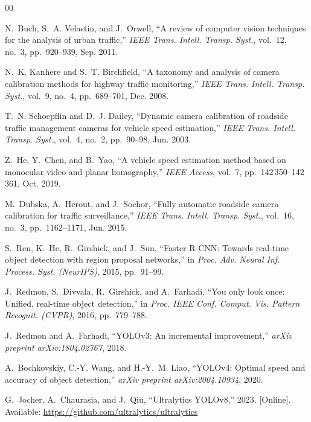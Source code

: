 \documentclass[conference]{IEEEtran}
\begin{document}

\begin{thebibliography}{00}

N.~Buch, S.~A. Velastin, and J.~Orwell, ``A review of computer vision techniques for the analysis of urban traffic,'' \emph{IEEE Trans. Intell. Transp. Syst.}, vol.~12, no.~3, pp.~920--939, Sep. 2011.

N.~K. Kanhere and S.~T. Birchfield, ``A taxonomy and analysis of camera calibration methods for highway traffic monitoring,'' \emph{IEEE Trans. Intell. Transp. Syst.}, vol.~9, no.~4, pp.~689--701, Dec. 2008.

T.~N. Schoepflin and D.~J. Dailey, ``Dynamic camera calibration of roadside traffic management cameras for vehicle speed estimation,'' \emph{IEEE Trans. Intell. Transp. Syst.}, vol.~4, no.~2, pp.~90--98, Jun. 2003.

Z.~He, Y.~Chen, and B.~Yao, ``A vehicle speed estimation method based on monocular video and planar homography,'' \emph{IEEE Access}, vol.~7, pp.~142\,350--142\,361, Oct. 2019.

M.~Dubska, A.~Herout, and J.~Sochor, ``Fully automatic roadside camera calibration for traffic surveillance,'' \emph{IEEE Trans. Intell. Transp. Syst.}, vol.~16, no.~3, pp.~1162--1171, Jun. 2015.

S.~Ren, K.~He, R.~Girshick, and J.~Sun, ``Faster R-CNN: Towards real-time object detection with region proposal networks,'' in \emph{Proc. Adv. Neural Inf. Process. Syst. (NeurIPS)}, 2015, pp.~91--99.

J.~Redmon, S.~Divvala, R.~Girshick, and A.~Farhadi, ``You only look once: Unified, real-time object detection,'' in \emph{Proc. IEEE Conf. Comput. Vis. Pattern Recognit. (CVPR)}, 2016, pp.~779--788.

J.~Redmon and A.~Farhadi, ``YOLOv3: An incremental improvement,'' \emph{arXiv preprint arXiv:1804.02767}, 2018.

A.~Bochkovskiy, C.-Y. Wang, and H.-Y.~M. Liao, ``YOLOv4: Optimal speed and accuracy of object detection,'' \emph{arXiv preprint arXiv:2004.10934}, 2020.

G.~Jocher, A.~Chaurasia, and J.~Qiu, ``Ultralytics YOLOv8,'' 2023. [Online]. Available: \url{https://github.com/ultralytics/ultralytics}


\end{thebibliography}
\end{document}
